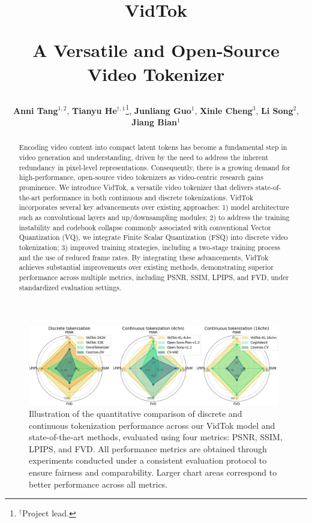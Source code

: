 \documentclass{article} %
\title{\centerline{VidTok} \vspace{-2mm} \leavevmode \centerline{A Versatile and Open-Source Video Tokenizer}}
\author{
\textbf{Anni Tang}$^{1,2}$, \textbf{Tianyu He}$^{\dag,1}$\thanks{$^{\dag}$Project lead.}, \textbf{Junliang Guo}$^1$, \textbf{Xinle Cheng}$^3$, \textbf{Li Song}$^2$, \textbf{Jiang Bian}$^1$}
\affil{
$^1$Microsoft Research, $^2$Shanghai Jiao Tong University, $^3$Peking University
}
\affil{
\url{https://github.com/microsoft/VidTok}
}
\begin{document}
\maketitle

\begin{abstract}
Encoding video content into compact latent tokens has become a fundamental step in video generation and understanding, driven by the need to address the inherent redundancy in pixel-level representations. Consequently, there is a growing demand for high-performance, open-source video tokenizers as video-centric research gains prominence. We introduce VidTok, a versatile video tokenizer that delivers state-of-the-art performance in both continuous and discrete tokenizations. VidTok incorporates several key advancements over existing approaches: 1) model architecture such as convolutional layers and up/downsampling modules; 2) to address the training instability and codebook collapse commonly associated with conventional Vector Quantization (VQ), we integrate Finite Scalar Quantization (FSQ) into discrete video tokenization; 3) improved training strategies, including a two-stage training process and the use of reduced frame rates. By integrating these advancements, VidTok achieves substantial improvements over existing methods, demonstrating superior performance across multiple metrics, including PSNR, SSIM, LPIPS, and FVD, under standardized evaluation settings.
\end{abstract}

\begin{figure}[h]
  \centering
  \includegraphics[width=0.98\textwidth]{imgs/radar.png}
  \caption{Illustration of the quantitative comparison of discrete and continuous tokenization performance across our VidTok model and state-of-the-art methods, evaluated using four metrics: PSNR, SSIM, LPIPS, and FVD. All performance metrics are obtained through experiments conducted under a consistent evaluation protocol to ensure fairness and comparability. Larger chart areas correspond to better performance across all metrics.}
  \label{fig:demo}
  \vspace{-0mm}
\end{figure}
\end{document}
